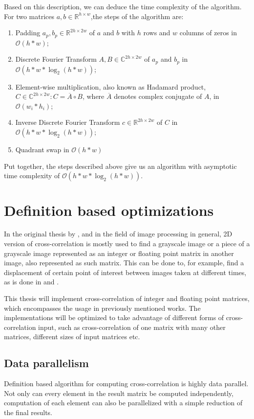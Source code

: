 Based on this description, we can deduce the time complexity of the algorithm. For two matrices $a,b \in \mathbb{R}^{h \times w}$,the steps of the algorithm are:
\begin{enumerate}
	\item Padding $a_p, b_p \in \mathbb{R}^{2h \times 2w}$ of $a$ and $b$ with $h$ rows and $w$ columns of zeros in $\mathcal{O}(h*w)$;
	\item Discrete Fourier Transform $A,B 
	\in \mathbb{C}^{2h \times 2w}$ of $a_p$ and $b_p$ in $\mathcal{O}(h*w*\log_2(h*w))$;
	\item Element-wise multiplication, also known as Hadamard product, $C \in \mathbb{C}^{2h \times 2w}: C = \overline{A} \circ B$, where $\overline{A}$ denotes complex conjugate of $A$, in $\mathcal{O}(w_i*h_i)$;
	\item Inverse Discrete Fourier Transform $c \in \mathbb{R}^{2h \times 2w}$ of $C$ in $\mathcal{O}(h*w*\log_2(h*w))$;
	\item Quadrant swap in $\mathcal{O}(h*w)$
\end{enumerate}

Put together, the steps described above give us an algorithm with asymptotic time complexity of $\mathcal{O}(h*w*\log_2(h*w))$.

\section{Definition based optimizations}
\label{sec:cross_corr_opt}
In the original thesis by \citet{misko}, and in the field of image processing in general, 2D version of cross-correlation is mostly used to find a grayscale image or a piece of a grayscale image represented as an integer or floating point matrix in another image, also represented as such matrix. This can be done to, for example, find a displacement of certain point of interest between images taken at different times, as is done in \citet{misko} and \citet{zhang2015}. 

This thesis will implement cross-correlation of integer and floating point matrices, which encompasses the usage in previously mentioned works. The implementations will be optimized to take advantage of different forms of cross-correlation input, such as cross-correlation of one matrix with many other matrices, different sizes of input matrices etc. 

\subsection{Data parallelism}
\label{sec:cross_corr_para}
Definition based algorithm for computing cross-correlation is highly data parallel. Not only can every element in the result matrix be computed independently, computation of each element can also be parallelized with a simple reduction of the final results.

